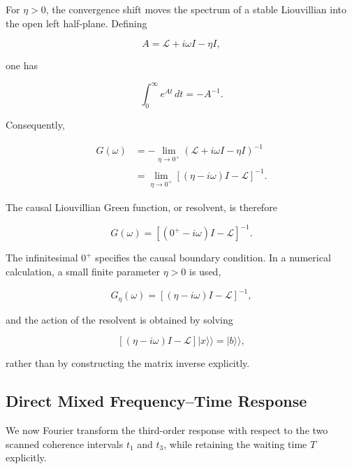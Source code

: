 \documentclass[11pt]{article}
\begin{document}
For $\eta>0$, the convergence shift moves the spectrum of a stable
Liouvillian into the open left half-plane. Defining

\begin{equation}
A
=
\mathcal{L}
+
i\omega I
-
\eta I,
\end{equation}

one has

\begin{equation}
\int_0^\infty
e^{At}\,dt
=
-A^{-1}.
\end{equation}

Consequently,

\begin{align}
G(\omega)
&=
-\lim_{\eta\rightarrow0^+}
\left(
\mathcal{L}
+
i\omega I
-
\eta I
\right)^{-1}
\\
&=
\lim_{\eta\rightarrow0^+}
\left[
(\eta-i\omega)I
-
\mathcal{L}
\right]^{-1}.
\end{align}

The causal Liouvillian Green function, or resolvent, is therefore

\begin{equation}
\boxed{
G(\omega)
=
\left[
(0^+-i\omega)I-\mathcal{L}
\right]^{-1}.
}
\label{eq:resolvent}
\end{equation}

The infinitesimal $0^+$ specifies the causal boundary condition. In a
numerical calculation, a small finite parameter $\eta>0$ is used,

\begin{equation}
G_{\eta}(\omega)
=
\left[
(\eta-i\omega)I-\mathcal{L}
\right]^{-1},
\label{eq:numerical_resolvent}
\end{equation}

and the action of the resolvent is obtained by solving

\begin{equation}
\left[
(\eta-i\omega)I-\mathcal{L}
\right]
|x\rangle\rangle
=
|b\rangle\rangle,
\end{equation}

rather than by constructing the matrix inverse explicitly.


\subsection{Direct Mixed Frequency--Time Response}

We now Fourier transform the third-order response with respect to the
two scanned coherence intervals $t_1$ and $t_3$, while retaining the
waiting time $T$ explicitly.
\end{document}
